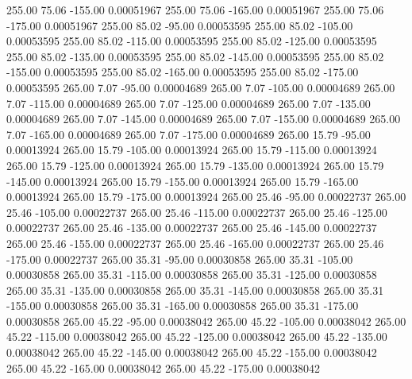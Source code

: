     255.00     75.06   -155.00     0.00051967
    255.00     75.06   -165.00     0.00051967
    255.00     75.06   -175.00     0.00051967
    255.00     85.02    -95.00     0.00053595
    255.00     85.02   -105.00     0.00053595
    255.00     85.02   -115.00     0.00053595
    255.00     85.02   -125.00     0.00053595
    255.00     85.02   -135.00     0.00053595
    255.00     85.02   -145.00     0.00053595
    255.00     85.02   -155.00     0.00053595
    255.00     85.02   -165.00     0.00053595
    255.00     85.02   -175.00     0.00053595
    265.00      7.07    -95.00     0.00004689
    265.00      7.07   -105.00     0.00004689
    265.00      7.07   -115.00     0.00004689
    265.00      7.07   -125.00     0.00004689
    265.00      7.07   -135.00     0.00004689
    265.00      7.07   -145.00     0.00004689
    265.00      7.07   -155.00     0.00004689
    265.00      7.07   -165.00     0.00004689
    265.00      7.07   -175.00     0.00004689
    265.00     15.79    -95.00     0.00013924
    265.00     15.79   -105.00     0.00013924
    265.00     15.79   -115.00     0.00013924
    265.00     15.79   -125.00     0.00013924
    265.00     15.79   -135.00     0.00013924
    265.00     15.79   -145.00     0.00013924
    265.00     15.79   -155.00     0.00013924
    265.00     15.79   -165.00     0.00013924
    265.00     15.79   -175.00     0.00013924
    265.00     25.46    -95.00     0.00022737
    265.00     25.46   -105.00     0.00022737
    265.00     25.46   -115.00     0.00022737
    265.00     25.46   -125.00     0.00022737
    265.00     25.46   -135.00     0.00022737
    265.00     25.46   -145.00     0.00022737
    265.00     25.46   -155.00     0.00022737
    265.00     25.46   -165.00     0.00022737
    265.00     25.46   -175.00     0.00022737
    265.00     35.31    -95.00     0.00030858
    265.00     35.31   -105.00     0.00030858
    265.00     35.31   -115.00     0.00030858
    265.00     35.31   -125.00     0.00030858
    265.00     35.31   -135.00     0.00030858
    265.00     35.31   -145.00     0.00030858
    265.00     35.31   -155.00     0.00030858
    265.00     35.31   -165.00     0.00030858
    265.00     35.31   -175.00     0.00030858
    265.00     45.22    -95.00     0.00038042
    265.00     45.22   -105.00     0.00038042
    265.00     45.22   -115.00     0.00038042
    265.00     45.22   -125.00     0.00038042
    265.00     45.22   -135.00     0.00038042
    265.00     45.22   -145.00     0.00038042
    265.00     45.22   -155.00     0.00038042
    265.00     45.22   -165.00     0.00038042
    265.00     45.22   -175.00     0.00038042
